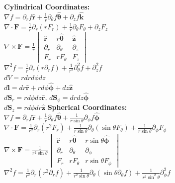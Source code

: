 \documentclass[12pt]{article}
\begin{document}
\begin{paracol}{3}
\textbf{Cylindrical Coordinates:} \\
$\nabla f = \partial_{r} f \hat{\mathbf{r}} + \frac{1}{r} \partial_{\theta} f \hat{\boldsymbol{\theta}} + \partial_{z} f \hat{\mathbf{k}}$ \\
$\nabla \cdot \mathbf{F} = \frac{1}{r} \partial_{r}(r F_r) + \frac{1}{r} \partial_{\theta} F_\theta + \partial_{z} F_z$ \\
$\nabla \times \mathbf{F} = \frac{1}{r} 
\begin{vmatrix}
\hat{\mathbf{r}} & r\hat{\boldsymbol{\theta}} & \hat{\mathbf{z}} \\
\partial_{r} & \partial_{\theta} & \partial_{z} \\
F_r & rF_\theta & F_z
\end{vmatrix}$\\
$\nabla^2 f = \frac{1}{r} \partial_{r}(r \partial_{r} f) + \frac{1}{r^2} \partial^2_\theta f + \partial^2_z f$\\
$dV = r dr d\phi dz$ \\
$d\mathbf{l} = dr\mathbf{\hat r}+rd \phi \boldsymbol{\hat\phi}+dz\mathbf{\hat z}$ \\
$d \mathbf{S}_r=r d\phi dz\mathbf{\hat r}$, 
$d\mathbf{S}_\phi=dr dz\boldsymbol{\hat{\phi}}$ \\
$ d \mathbf{S}_z=r d\phi dr\mathbf{\hat{z}}$
\switchcolumn
\textbf{Spherical Coordinates:} \\
$\nabla f = \partial_{r} f \hat{\mathbf{r}} + \frac{1}{r} \partial_{\theta} f \hat{\boldsymbol{\theta}} + \frac{1}{r \sin\theta} \partial_{\phi} f \hat{\boldsymbol{\phi}}$ \\
$\nabla \cdot \mathbf{F} = \frac{1}{r^2} \partial_{r}(r^2 F_r) + \frac{1}{r \sin\theta} \partial_{\theta}(\sin\theta F_\theta) + \frac{1}{r \sin\theta} \partial_{\phi} F_\phi$ \\
$\nabla \times \mathbf{F} = \frac{1}{r^2 \sin\theta} 
\begin{vmatrix}
\hat{\mathbf{r}} & r\hat{\boldsymbol{\theta}} & r\sin\theta \hat{\boldsymbol{\phi}} \\
\partial_{r} & \partial_{\theta} & \partial_{\phi} \\
F_r & rF_\theta & r\sin\theta F_\phi
\end{vmatrix}$ \\
$\nabla^2 f = \frac{1}{r^2} \partial_{r}(r^2 \partial_{r} f) + \frac{1}{r^2 \sin\theta} \partial_{\theta}(\sin\theta \partial_{\theta} f) + \frac{1}{r^2 \sin^2\theta} \partial^2_\phi f$

\end{paracol}
\end{document}
